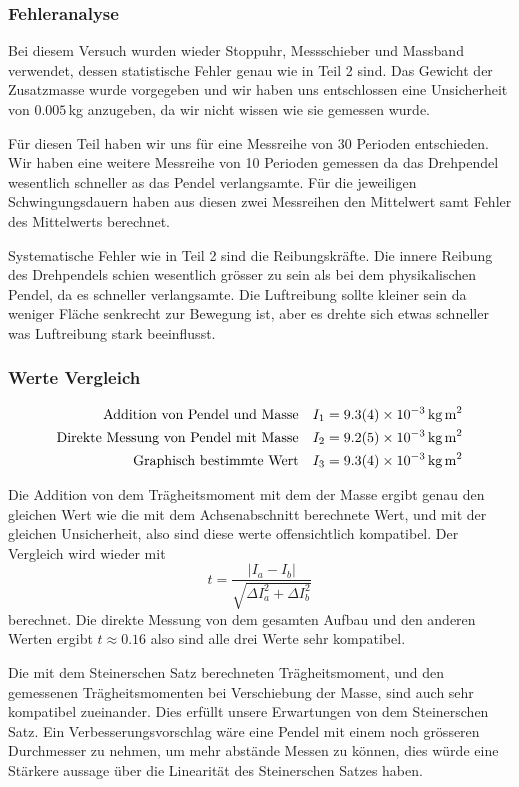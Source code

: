 \documentclass[11pt,a4paper]{article}
\begin{document}
\subsubsection{Fehleranalyse}
Bei diesem Versuch wurden wieder Stoppuhr, Messschieber und Massband verwendet, dessen statistische Fehler genau wie in Teil 2 sind. Das Gewicht der Zusatzmasse wurde vorgegeben und wir haben uns entschlossen eine Unsicherheit von $0.005\,$kg anzugeben, da wir nicht wissen wie sie gemessen wurde. 

Für diesen Teil haben wir uns für eine Messreihe von 30 Perioden entschieden. Wir haben eine weitere Messreihe von 10 Perioden gemessen da das Drehpendel wesentlich schneller as das Pendel verlangsamte. Für die jeweiligen Schwingungsdauern haben aus diesen zwei Messreihen den Mittelwert samt Fehler des Mittelwerts berechnet. 

Systematische Fehler wie in Teil 2 sind die Reibungskräfte. Die innere Reibung des Drehpendels schien wesentlich grösser zu sein als bei dem physikalischen Pendel, da es schneller verlangsamte. Die Luftreibung sollte kleiner sein da weniger Fläche senkrecht zur Bewegung ist, aber es drehte sich etwas schneller was Luftreibung stark beeinflusst. 

\subsubsection{Werte Vergleich}

\begin{align*}
	\textrm{Addition von Pendel und Masse} \quad & I_1 = 9.3(4) \times 10^{-3}\,\textrm{kg\,m}^2\\
	\textrm{Direkte Messung von Pendel mit Masse} \quad & I_2 = 9.2(5) \times 10^{-3}\,\textrm{kg\,m}^2\\
	\textrm{Graphisch bestimmte Wert} \quad & I_3 = 9.3(4) \times 10^{-3}\,\textrm{kg\,m}^2
\end{align*}

Die Addition von dem Trägheitsmoment mit dem der Masse ergibt genau den gleichen Wert wie die mit dem Achsenabschnitt berechnete Wert, und mit der gleichen Unsicherheit, also sind diese werte offensichtlich kompatibel. Der Vergleich wird wieder mit 
$$t = \frac{|I_a-I_b|}{\sqrt{\Delta I_a^2 + \Delta I_b^2}}$$
berechnet. Die direkte Messung von dem gesamten Aufbau und den anderen Werten ergibt $t \approx 0.16$ also sind alle drei Werte sehr kompatibel. 

Die mit dem Steinerschen Satz berechneten Trägheitsmoment, und den gemessenen Trägheitsmomenten bei Verschiebung der Masse, sind auch sehr kompatibel zueinander. Dies erfüllt unsere Erwartungen von dem Steinerschen Satz. Ein Verbesserungsvorschlag wäre eine Pendel mit einem noch grösseren Durchmesser zu nehmen, um mehr abstände Messen zu können, dies würde eine Stärkere aussage über die Linearität des Steinerschen Satzes haben.
\end{document}
